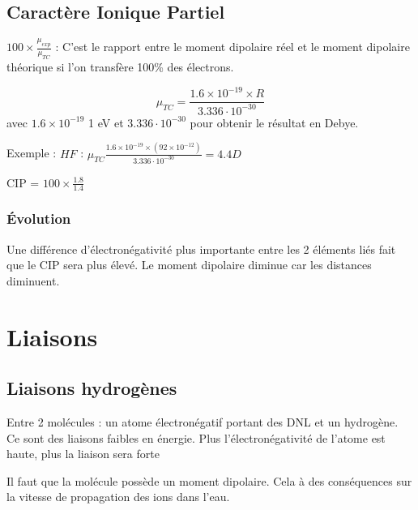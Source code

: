 \documentclass[french]{yLectureNote}
\begin{document}
\subsection{Caractère Ionique Partiel}
$100\times \frac{\mu_{exp}}{\mu_{TC}}$ : C'est le rapport entre le moment dipolaire réel et le moment dipolaire théorique si l'on transfère 100\% des électrons.


\begin{theorem}[Calculer $\mu_{TC}$]
\[\mu_{TC} = \frac{1.6\times 10^{-19} \times R}{3.336\cdot 10^{-30}}\] avec $1.6\times 10^{-19}$ 1 eV et $3.336\cdot 10^{-30}$ pour obtenir le résultat en Debye.
\end{theorem}
Exemple : $HF$ : $\mu_{TC} \frac{1.6\times 10^{-19} \times (92\times 10^{-12})}{3.336\cdot 10^{-30}} = 4.4D$

CIP = $100\times \frac{1.8}{1.4}$
\subsubsection{Évolution}
Une différence d'électronégativité plus importante entre les 2 éléments liés fait que le CIP sera plus élevé. Le moment dipolaire diminue car les distances diminuent.
\section{Liaisons}
\subsection{Liaisons hydrogènes}
\begin{theorem}[Définition]
Entre 2 molécules : un atome électronégatif portant des DNL et un hydrogène. Ce sont des liaisons faibles en énergie. Plus l'électronégativité de l'atome est haute, plus la liaison sera forte
\end{theorem}
Il faut que la molécule possède un moment dipolaire. Cela à des conséquences sur la vitesse de propagation des ions dans l'eau.
\end{document}
